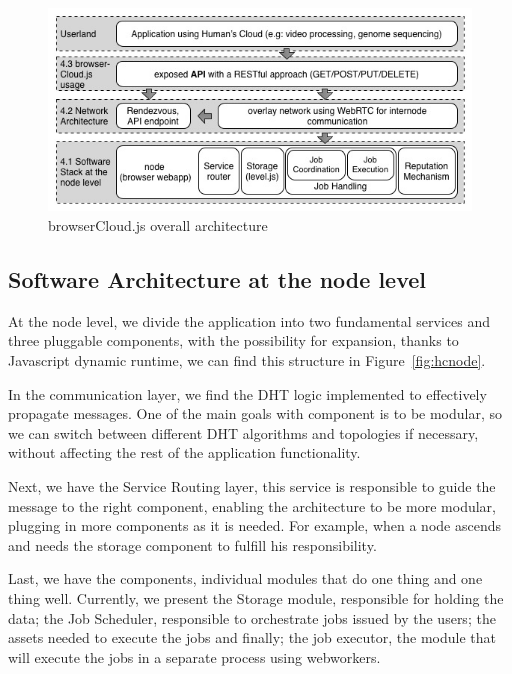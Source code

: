 \begin{figure}[h!]
  \centering
  \includegraphics[width=\textwidth]{img/softwarestack.jpg}
  \caption{browserCloud.js overall architecture}
  \label{fig:softwarestack}
\end{figure}


\subsection{Software Architecture at the node level}

At the node level, we divide the application into two fundamental services and three pluggable components, with the possibility for expansion, thanks to Javascript dynamic runtime, we can find this structure in Figure~\ref{fig:hcnode}.

In the communication layer, we find the DHT logic implemented to effectively propagate messages. One of the main goals with component is to be modular, so we can switch between different DHT algorithms and topologies if necessary, without affecting the rest of the application functionality.

Next, we have the Service Routing layer, this service is responsible to guide the message to the right component, enabling the architecture to be more modular, plugging in more components as it is needed. For example, when a node ascends and needs the storage component to fulfill his responsibility.

Last, we have the components, individual modules that do one thing and one thing well. Currently, we present the Storage module, responsible for holding the data; the Job Scheduler, responsible to orchestrate jobs issued by the users; the assets needed to execute the jobs and finally; the job executor, the module that will execute the jobs in a separate process using webworkers.



